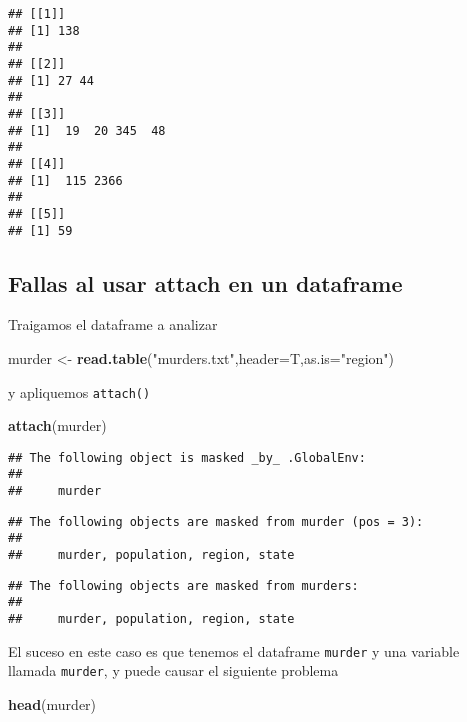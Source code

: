 \documentclass[]{article}
\newenvironment{Shaded}{\begin{snugshade}}{\end{snugshade}}
\newcommand{\KeywordTok}[1]{\textcolor[rgb]{0.13,0.29,0.53}{\textbf{#1}}}
\newcommand{\DataTypeTok}[1]{\textcolor[rgb]{0.13,0.29,0.53}{#1}}
\newcommand{\StringTok}[1]{\textcolor[rgb]{0.31,0.60,0.02}{#1}}
\newcommand{\NormalTok}[1]{#1}
\begin{document}
\begin{verbatim}
## [[1]]
## [1] 138
## 
## [[2]]
## [1] 27 44
## 
## [[3]]
## [1]  19  20 345  48
## 
## [[4]]
## [1]  115 2366
## 
## [[5]]
## [1] 59
\end{verbatim}

\subsection{Fallas al usar attach en un
dataframe}\label{fallas-al-usar-attach-en-un-dataframe}

Traigamos el dataframe a analizar

\begin{Shaded}
\begin{Highlighting}[]
\NormalTok{murder <-}\StringTok{ }\KeywordTok{read.table}\NormalTok{(}\StringTok{"murders.txt"}\NormalTok{,}\DataTypeTok{header=}\NormalTok{T,}\DataTypeTok{as.is=}\StringTok{"region"}\NormalTok{)}
\end{Highlighting}
\end{Shaded}

y apliquemos \texttt{attach()}

\begin{Shaded}
\begin{Highlighting}[]
\KeywordTok{attach}\NormalTok{(murder)}
\end{Highlighting}
\end{Shaded}

\begin{verbatim}
## The following object is masked _by_ .GlobalEnv:
## 
##     murder
\end{verbatim}

\begin{verbatim}
## The following objects are masked from murder (pos = 3):
## 
##     murder, population, region, state
\end{verbatim}

\begin{verbatim}
## The following objects are masked from murders:
## 
##     murder, population, region, state
\end{verbatim}

El suceso en este caso es que tenemos el dataframe \texttt{murder} y una
variable llamada \texttt{murder}, y puede causar el siguiente problema

\begin{Shaded}
\begin{Highlighting}[]
\KeywordTok{head}\NormalTok{(murder)}
\end{Highlighting}
\end{Shaded}
\end{document}
